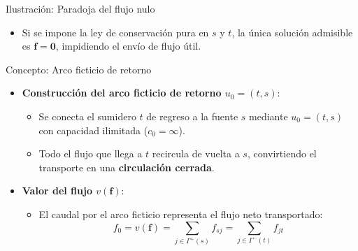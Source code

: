 \documentclass[
  ignorenonframetext,
]{beamer}
\providecommand{\tightlist}{%
  \setlength{\itemsep}{0pt}\setlength{\parskip}{0pt}}
\begin{document}
\begin{frame}{Ilustración: Paradoja del flujo nulo}
\label{ilustraciuxf3n-paradoja-del-flujo-nulo}
\begin{itemize}
\tightlist
\item
  Si se impone la ley de conservación pura en \(s\) y \(t\), la única
  solución admisible es \(\mathbf{f} = \mathbf{0}\), impidiendo el envío
  de flujo útil.
\end{itemize}
\end{frame}

\begin{frame}{Concepto: Arco ficticio de retorno}
\label{concepto-arco-ficticio-de-retorno}
\begin{itemize}
\tightlist
\item
  \textbf{Construcción del arco ficticio de retorno \(u_0 = (t, s)\)}:

  \begin{itemize}
  \tightlist
  \item
    Se conecta el sumidero \(t\) de regreso a la fuente \(s\) mediante
    \(u_0 = (t, s)\) con capacidad ilimitada (\(c_0 = \infty\)).
  \item
    Todo el flujo que llega a \(t\) recircula de vuelta a \(s\),
    convirtiendo el transporte en una \textbf{circulación cerrada}.
  \end{itemize}
\item
  \textbf{Valor del flujo \(v(\mathbf{f})\)}:

  \begin{itemize}
  \tightlist
  \item
    El caudal por el arco ficticio representa el flujo neto
    transportado:
    \[f_0 = v(\mathbf{f}) = \sum_{j \in \Gamma^+(s)} f_{sj} = \sum_{j \in \Gamma^-(t)} f_{jt}\]
  \end{itemize}
\end{itemize}
\end{frame}
\end{document}
